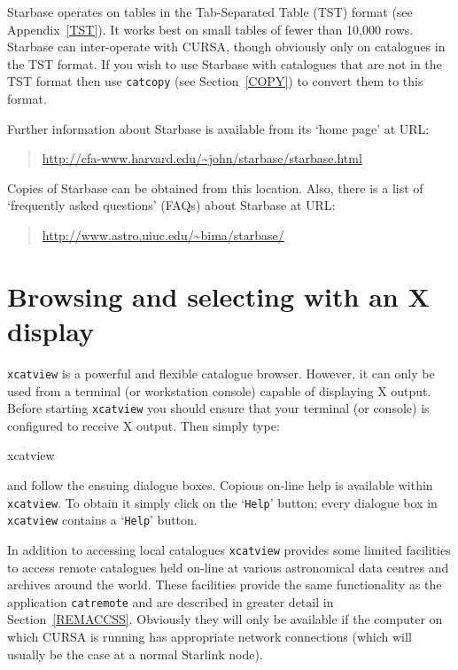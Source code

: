 \documentclass[twoside,11pt]{starlink}
\begin{document}
Starbase operates on tables in the Tab-Separated Table (TST) format
(see Appendix~\ref{TST}).  It works best on small tables of fewer than
10,000 rows.  Starbase can inter-operate with CURSA, though obviously
only on catalogues in the TST format.  If you wish to use Starbase with
catalogues that are not in the TST format then use \texttt{catcopy} (see
Section~\ref{COPY}) to convert them to this format.

Further information about Starbase is available from its `home page'
at URL:

\begin{quote}
\url{http://cfa-www.harvard.edu/~john/starbase/starbase.html}
\end{quote}

Copies of Starbase can be obtained from this location.  Also, there is a
list of `frequently asked questions' (FAQs) about Starbase at URL:

\begin{quote}
\url{http://www.astro.uiuc.edu/~bima/starbase/}
\end{quote}


\section{\label{XVIEW}Browsing and selecting with an X display}

\texttt{xcatview} is a powerful and flexible catalogue browser. However,
it can only be used from a terminal (or workstation console) capable
of displaying X output. Before starting \texttt{xcatview} you should ensure
that your terminal (or console) is configured to receive X output. Then
simply type:

\begin{terminalv}
xcatview
\end{terminalv}

and follow the ensuing dialogue boxes. Copious on-line help is available
within \texttt{xcatview}. To obtain it simply click on the `\texttt{Help}'
button; every dialogue box in \texttt{xcatview} contains a `\texttt{Help}'
button.

In addition to accessing local catalogues \texttt{xcatview} provides some
limited facilities to access remote catalogues held on-line at various
astronomical data centres and archives around the world.  These facilities
provide the same functionality as the application \texttt{catremote} and
are described in greater detail in Section~\ref{REMACCSS}.  Obviously
they will only be available if the computer on which CURSA is running
has appropriate network connections (which will usually be the case at
a normal Starlink node).
\end{document}
